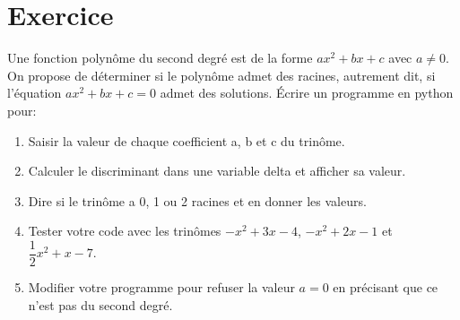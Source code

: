 \documentclass[11pt]{article}
\providecommand{\tightlist}{%
      \setlength{\itemsep}{0pt}\setlength{\parskip}{0pt}}
\begin{document}
    \hypertarget{exercice}{%
\section{Exercice}\label{exercice}}

Une fonction polynôme du second degré est de la forme \(ax^2+bx+c\) avec
$ a \neq  0$.\\
On propose de déterminer si le polynôme admet des racines, autrement
dit, si l'équation \(ax^2+bx+c=0\) admet des solutions. Écrire un
programme en python pour:

\begin{enumerate}
\def\labelenumi{\arabic{enumi}.}
\tightlist
\item
  Saisir la valeur de chaque coefficient a, b et c du trinôme.
\item
  Calculer le discriminant dans une variable delta et afficher sa
  valeur.
\item
  Dire si le trinôme a 0, 1 ou 2 racines et en donner les valeurs.
\item
  Tester votre code avec les trinômes \(-x^2+3x-4\), \(-x^2+2x-1\) et
  \(\dfrac{1}{2}x^2+x-7\).
\item
  Modifier votre programme pour refuser la valeur \(a=0\) en précisant
  que ce n'est pas du second degré.
\end{enumerate}
    
\end{document}
